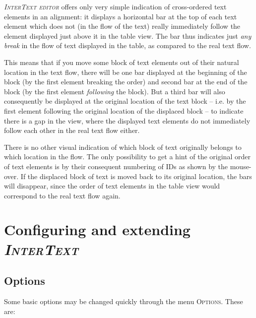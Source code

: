 \documentclass[a4paper,10pt,oneside]{book}
\newcommand{\IT}{\textit{\textsc{InterText}}\xspace}
\newcommand{\ITeditor}{\textit{\textsc{InterText editor}}\xspace}
\newcommand{\menu}[1]{\textsc{#1}}
\begin{document}
\ITeditor offers only very simple indication of cross-ordered text elements in an alignment: it displays a horizontal bar at the top of each text element which does not (in the flow of the text) really immediately follow the element displayed just above it in the table view. The bar thus indicates just \emph{any break} in the flow of text displayed in the table, as compared to the real text flow.

This means that if you move some block of text elements out of their natural location in the text flow, there will be one bar displayed at the beginning of the block (by the first element breaking the order) and second bar at the end of the block (by the first element \emph{following} the block). But a third bar will also consequently be displayed at the original location of the text block -- i.e. by the first element following the original location of the displaced block -- to indicate there is a gap in the view, where the displayed text elements do not immediately follow each other in the real text flow either.

There is no other visual indication of which block of text originally belongs to which location in the flow. The only possibility to get a hint of the original order of text elements is by their consequent numbering of IDs as shown by the mouse-over. If the displaced block of text is moved back to its original location, the bars will disappear, since the order of text elements in the table view would correspond to the real text flow again.

\chapter{Configuring and extending \IT}\label{ch:detail:config}

\section{Options}\label{ch:detail:config:options}

Some basic options may be changed quickly through the menu \menu{Options}. These are:
\end{document}

